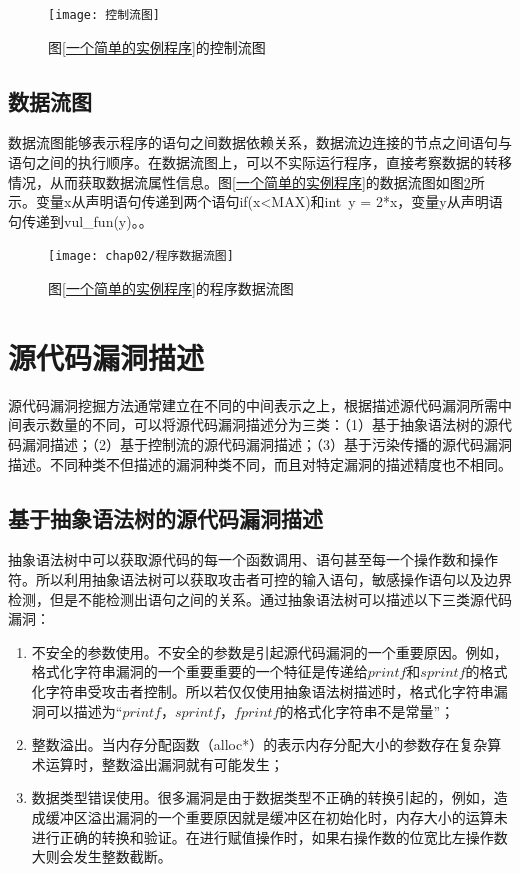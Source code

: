 \begin{figure}[htp]
\centering
\texttt{[image: 控制流图]}
\caption{图\ref{一个简单的实例程序}的控制流图}
\label{控制流图}
\end{figure}

\subsection{数据流图}

数据流图能够表示程序的语句之间数据依赖关系，数据流边连接的节点之间语句与语句之间的执行顺序。在数据流图上，可以不实际运行程序，直接考察数据的转移情况，从而获取数据流属性信息。图\ref{一个简单的实例程序}的数据流图如图\ref{程序数据流图}所示。变量x从声明语句传递到两个语句if(x<MAX)和int\ y = 2*x，变量y从声明语句传递到vul\_fun(y)。。

\begin{figure}[htp]
\centering
\texttt{[image: chap02/程序数据流图]}
\caption{图\ref{一个简单的实例程序}的程序数据流图}
\label{程序数据流图}
\end{figure}

\section{源代码漏洞描述}

源代码漏洞挖掘方法通常建立在不同的中间表示之上，根据描述源代码漏洞所需中间表示数量的不同，可以将源代码漏洞描述分为三类：（1）基于抽象语法树的源代码漏洞描述；（2）基于控制流的源代码漏洞描述；（3）基于污染传播的源代码漏洞描述。不同种类不但描述的漏洞种类不同，而且对特定漏洞的描述精度也不相同。

\subsection{基于抽象语法树的源代码漏洞描述}

抽象语法树中可以获取源代码的每一个函数调用、语句甚至每一个操作数和操作符。所以利用抽象语法树可以获取攻击者可控的输入语句，敏感操作语句以及边界检测，但是不能检测出语句之间的关系。通过抽象语法树可以描述以下三类源代码漏洞：

\begin{enumerate}[(1)]
\item 不安全的参数使用。不安全的参数是引起源代码漏洞的一个重要原因。例如，格式化字符串漏洞的一个重要重要的一个特征是传递给$printf$和$sprintf$的格式化字符串受攻击者控制。所以若仅仅使用抽象语法树描述时，格式化字符串漏洞可以描述为“$printf$，$sprintf$，$fprintf$的格式化字符串不是常量”；
\item 整数溢出。当内存分配函数（alloc*）的表示内存分配大小的参数存在复杂算术运算时，整数溢出漏洞就有可能发生；
\item 数据类型错误使用。很多漏洞是由于数据类型不正确的转换引起的，例如，造成缓冲区溢出漏洞的一个重要原因就是缓冲区在初始化时，内存大小的运算未进行正确的转换和验证。在进行赋值操作时，如果右操作数的位宽比左操作数大则会发生整数截断。
\end{enumerate}

